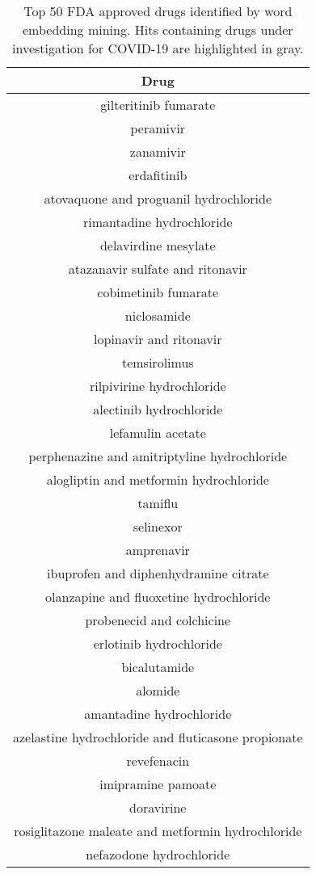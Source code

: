 \documentclass{article}
\newcommand{\lgc}[1]{\cellcolor[gray]{0.85}#1}
\begin{document}
\begin{table}[ht]
\small
\centering
\caption{Top 50 FDA approved drugs identified by word embedding mining. Hits containing drugs under investigation for COVID-19 are highlighted in gray.}
\label{tab:drugs_top50}
\begin{tabular}[t]{c}
\hline
Drug \\
\hline
gilteritinib fumarate \\
peramivir \\
zanamivir \\
erdafitinib \\
atovaquone and proguanil hydrochloride \\
rimantadine hydrochloride \\
delavirdine mesylate \\
\lgc{atazanavir sulfate and ritonavir\cite{cao2020trial}} \\
cobimetinib fumarate \\
niclosamide \\
\lgc{lopinavir and ritonavir\cite{cao2020trial}} \\
temsirolimus \\
rilpivirine hydrochloride \\
alectinib hydrochloride \\
lefamulin acetate \\
perphenazine and amitriptyline hydrochloride \\
alogliptin and metformin hydrochloride \\
tamiflu \\
selinexor \\
amprenavir \\
ibuprofen and diphenhydramine citrate \\
olanzapine and fluoxetine hydrochloride \\
\lgc{probenecid and colchicine\cite{colcorona}} \\
erlotinib hydrochloride \\
bicalutamide \\
alomide \\
amantadine hydrochloride \\
azelastine hydrochloride and fluticasone propionate \\
revefenacin \\
imipramine pamoate \\
doravirine \\
rosiglitazone maleate and metformin hydrochloride \\
nefazodone hydrochloride \\

\end{tabular}
\end{table}
\end{document}
